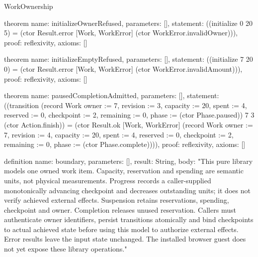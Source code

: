 \begin{lexlean}{WorkOwnership}
\begin{semanticmodule}
theorem{
  name: initializeOwnerRefused,
  parameters: [],
  statement: ((initialize 0 20 5) = (ctor Result.error [Work, WorkError] (ctor WorkError.invalidOwner))),
  proof: reflexivity{},
  axioms: []
}

theorem{
  name: initializeEmptyRefused,
  parameters: [],
  statement: ((initialize 7 20 0) = (ctor Result.error [Work, WorkError] (ctor WorkError.invalidAmount))),
  proof: reflexivity{},
  axioms: []
}

theorem{
  name: pausedCompletionAdmitted,
  parameters: [],
  statement: ((transition (record Work {owner := 7, revision := 3, capacity := 20, spent := 4, reserved := 0, checkpoint := 2, remaining := 0, phase := (ctor Phase.paused)}) 7 3 (ctor Action.finish)) = (ctor Result.ok [Work, WorkError] (record Work {owner := 7, revision := 4, capacity := 20, spent := 4, reserved := 0, checkpoint := 2, remaining := 0, phase := (ctor Phase.complete)}))),
  proof: reflexivity{},
  axioms: []
}

definition{
  name: boundary,
  parameters: [],
  result: String,
  body: "This pure library models one owned work item. Capacity, reservation and spending are semantic units, not physical measurements. Progress records a caller-supplied monotonically advancing checkpoint and decreases outstanding units; it does not verify achieved external effects. Suspension retains reservations, spending, checkpoint and owner. Completion releases unused reservation. Callers must authenticate owner identifiers, persist transitions atomically and bind checkpoints to actual achieved state before using this model to authorize external effects. Error results leave the input state unchanged. The installed browser guest does not yet expose these library operations."
}
\end{semanticmodule}
\end{lexlean}
